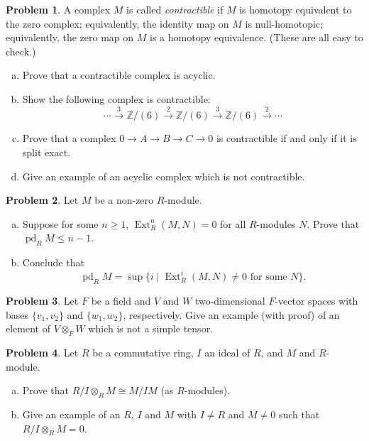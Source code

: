 \documentclass[11pt]{article}
\newcommand{\Z}{\mathbb{Z}}
\theoremstyle{definition}
\newtheorem{problem}{Problem}
\newcommand{\pd}{\operatorname{pd}}
\newcommand{\Ext}{\operatorname{Ext}}
\begin{document}
\begin{problem} A complex $M$ is called {\it contractible} if $M$ is homotopy equivalent to the zero complex; equivalently, the identity map on $M$ is null-homotopic; equivalently, the zero map on $M$ is a homotopy equivalence.  (These are all easy to check.)  
\begin{enumerate}[(a)]
\item Prove that a contractible complex is acyclic.
\item Show the following complex is contractible:
$$\cdots \xrightarrow{3} \Z/(6)\xrightarrow{2} \Z/(6)\xrightarrow{3} \Z/(6)\xrightarrow{2} \cdots$$
\item Prove that a complex $0\to A\to B\to C\to 0$ is contractible if and only if it is split exact. 
\item Give an example of an acyclic complex which is not contractible.
\end{enumerate}
\end{problem}

\begin{problem} Let $M$ be a non-zero $R$-module.
\begin{enumerate}[(a)]
\item Suppose for some $n\ge 1$, $\Ext^n_R(M,N)=0$ for all $R$-modules $N$.  Prove that $\pd_R M\le n-1$.
\item Conclude that 
$$\pd_R M=\sup \{i\mid \Ext^i_R(M,N)\neq 0 \text{ for some }N\}.$$
\end{enumerate}
\end{problem}

\begin{problem} Let $F$ be a field and $V$ and $W$ two-dimensional $F$-vector spaces with bases $\{v_1,v_2\}$ and $\{w_1,w_2\}$, respectively.  Give an example (with proof) of an element of $V\otimes_F W$ which is not a simple tensor. 
\end{problem}

\begin{problem} Let $R$ be a commutative ring, $I$ an ideal of $R$, and $M$ and $R$-module.  
\begin{enumerate}[(a)]
\item Prove that $R/I\otimes_R M\cong M/IM$ (as $R$-modules).
\item Give an example of an $R$, $I$ and $M$ with $I\neq R$ and $M\neq 0$ such that $R/I\otimes_R M=0$.
\end{enumerate}
\end{problem}


 
\end{document}
